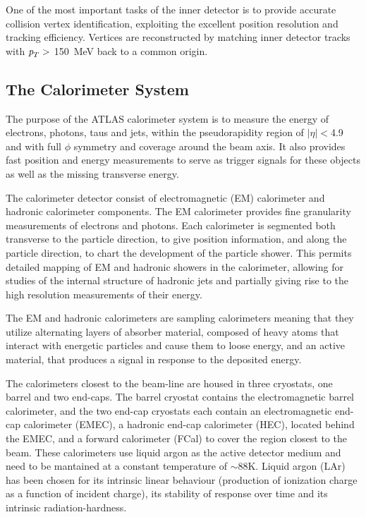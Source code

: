 One of the most important tasks of the inner detector is to provide accurate collision vertex identification, exploiting the excellent position resolution and tracking efficiency. Vertices are reconstructed by matching inner detector tracks with ${\emph{p}_{T}} >$ 150~MeV back to a common origin.%

\subsection{The Calorimeter System}\label{sec:atlasCALO}

The purpose of the ATLAS calorimeter system is to measure the energy of electrons, photons, taus and jets, within the pseudorapidity region of $|\eta| < $4.9 and with full $\phi$ symmetry and coverage around the beam axis. It also provides fast position and energy measurements to serve as trigger signals for these objects as well as the missing transverse energy. 

The calorimeter detector consist of electromagnetic (EM) calorimeter and hadronic calorimeter components. The EM calorimeter provides fine granularity measurements of electrons and photons.  Each calorimeter is segmented both transverse to the particle direction, to give position information, and along the particle direction, to chart the development of the particle shower.  This permits detailed mapping of EM and  hadronic showers in the calorimeter, allowing for studies of the internal structure of hadronic jets and partially giving rise to the high resolution measurements of their energy.

The EM and hadronic calorimeters are sampling calorimeters meaning that they utilize alternating layers of absorber material, composed of heavy atoms that interact with energetic particles and cause them to loose energy, and an active material, that produces a signal in response to the deposited  energy.

The calorimeters closest to the beam-line are housed in three cryostats, one barrel and two end-caps. The barrel cryostat contains the electromagnetic barrel calorimeter, and the two end-cap cryostats each contain an electromagnetic end-cap calorimeter (EMEC), a hadronic end-cap calorimeter (HEC), located behind the EMEC, and a forward calorimeter (FCal) to cover the region closest to the beam.  These calorimeters use liquid argon as the active detector medium and need to be mantained at a constant temperature of $\sim$88K.  Liquid argon (LAr) has been chosen for its intrinsic linear behaviour (production of ionization charge as a function of incident charge), its stability of response over time and its intrinsic radiation-hardness. 

